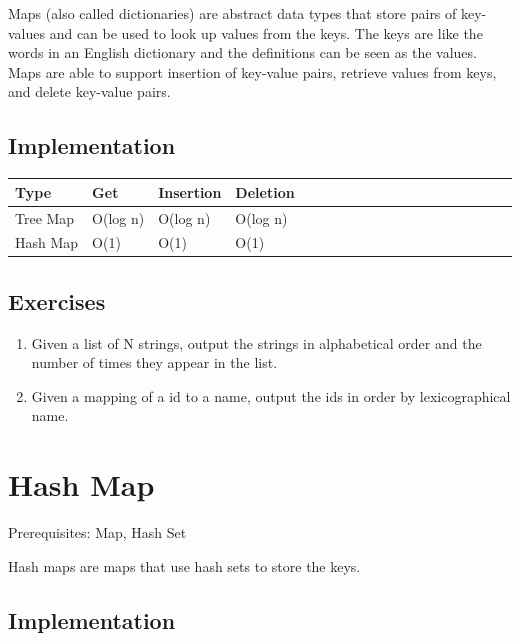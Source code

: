 \documentclass[11pt,oneside]{book}
\begin{document}
Maps (also called dictionaries) are abstract data types that store pairs of key-values and can be used to look up values from the keys. The keys are like the words in an English dictionary and the definitions can be seen as the values. Maps are able to support insertion of key-value pairs, retrieve values from keys, and delete key-value pairs.

\subsection{Implementation}

\vspace{10px}\begin{tabulary}{0.4\linewidth}{|l|l|l|l|l|l|l|l|l|l|l|l|l|l|l|l|l|l|l}\hline


  Type &
  Get &
  Insertion &
  Deletion\\
\hline


  Tree Map &
  O(log n) &
  O(log n) &
  O(log n)\\

  Hash Map &
  O(1) &
  O(1) &
  O(1)\\

\hline\end{tabulary}

\subsection{Exercises}

\begin{enumerate}
\item Given a list of N strings, output the strings in alphabetical order and the number of times they appear in the list.
\item Given a mapping of a id to a name, output the ids in order by lexicographical name.
\end{enumerate}

        \section{ Hash Map }
        

Prerequisites: Map, Hash Set



Hash maps are maps that use hash sets to store the keys.

\subsection{Implementation}
\end{document}
